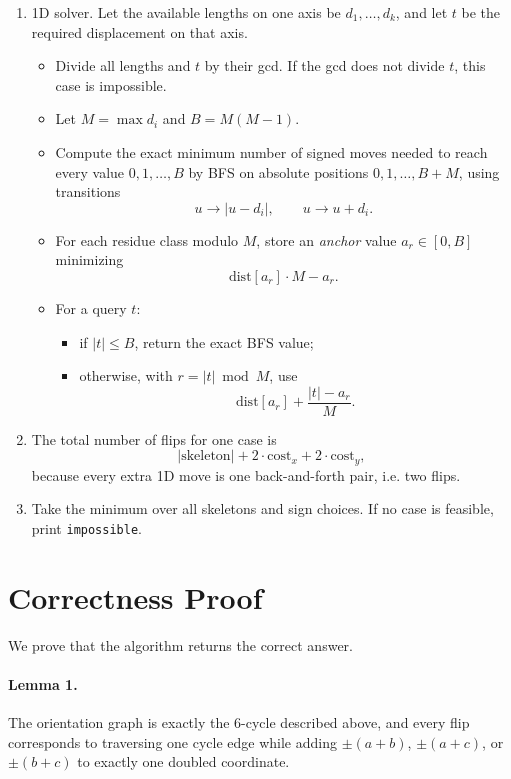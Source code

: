 \documentclass[11pt]{article}
\begin{document}
\begin{enumerate}[leftmargin=*]
    \item 1D solver. Let the available lengths on one axis be $d_1,\dots,d_k$, and let $t$ be the required displacement on that axis.
    \begin{itemize}[leftmargin=*]
        \item Divide all lengths and $t$ by their gcd. If the gcd does not divide $t$, this case is impossible.
        \item Let $M=\max d_i$ and $B=M(M-1)$.
        \item Compute the exact minimum number of signed moves needed to reach every value $0,1,\dots,B$ by BFS on absolute positions $0,1,\dots,B+M$, using transitions
        \[
        u \to |u-d_i|,\qquad u \to u+d_i.
        \]
        \item For each residue class modulo $M$, store an \emph{anchor} value $a_r \in [0,B]$ minimizing
        \[
        \text{dist}[a_r]\cdot M - a_r.
        \]
        \item For a query $t$:
        \begin{itemize}[leftmargin=*]
            \item if $|t|\le B$, return the exact BFS value;
            \item otherwise, with $r=|t|\bmod M$, use
            \[
            \text{dist}[a_r] + \frac{|t|-a_r}{M}.
            \]
        \end{itemize}
    \end{itemize}

    \item The total number of flips for one case is
    \[
    |\text{skeleton}| + 2\cdot \text{cost}_x + 2\cdot \text{cost}_y,
    \]
    because every extra 1D move is one back-and-forth pair, i.e. two flips.

    \item Take the minimum over all skeletons and sign choices. If no case is feasible, print \texttt{impossible}.
\end{enumerate}

\section*{Correctness Proof}

We prove that the algorithm returns the correct answer.

\paragraph{Lemma 1.}
The orientation graph is exactly the 6-cycle described above, and every flip corresponds to traversing one cycle edge while adding $\pm(a+b)$, $\pm(a+c)$, or $\pm(b+c)$ to exactly one doubled coordinate.
\end{document}
